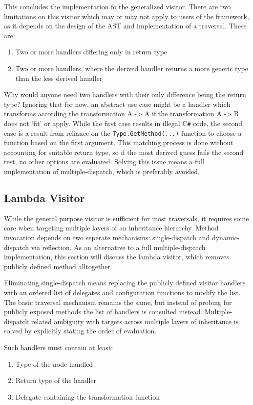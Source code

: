 \documentclass[twoside,openright]{uva-bachelor-thesis}
\newcommand{\code}[1]{\texttt{\footnotesize#1}}
\newcommand{\cs}{C\texttt{\#}\xspace}
\begin{document}
			This concludes the implementation fo the generalized visitor. There are two limitations on this visitor which may or may not apply to users of the framework, as it depends on the design of the AST and implementation of a traversal. These are:
			\begin{enumerate}
				\item Two or more handlers differing only in return type
				\item Two or more handlers, where the derived handler returns a more generic type than the less derived handler
			\end{enumerate}
			
			Why would anyone need two handlers with their only difference being the return type? Ignoring that for now, an abstract use case might be a handler which transforms according the transformation A -> A if the transformation A -> B does not `fit' or apply. While the first case results in illegal \cs code, the second case is a result from reliance on the \code{Type.GetMethod(...)} function to choose a function based on the first argument. This matching process is done without accounting for suitable return type, so if the most derived guess fails the second test, no other options are evaluated. Solving this issue means a full implementation of multiple-dispatch, which is preferably avoided.
			
				
		\subsection{Lambda Visitor}
			While the general purpose visitor is sufficient for most traversals, it requires some care when targeting multiple layers of an inheritance hierarchy. Method invocation depends on two seperate mechanisms: single-dispatch and dynamic-dispatch via reflection. As an alternative to a full multiple-dispatch implementation, this section will discuss the lambda visitor, which removes publicly defined method alltogether.
			
			Eliminating single-dispatch means replacing the publicly defined visitor handlers with an ordered list of delegates and configuration functions to modify the list. The basic traversal mechanism remains the same, but instead of probing for publicly exposed methods the list of handlers is consulted instead. Multiple-dispatch related ambiguity with targets across multiple layers of inheritance is solved by explicitly stating the order of evaluation.
			
			Such handlers must contain at least:
			\begin{enumerate}
				\item Type of the node handled
				\item Return type of the handler
				\item Delegate containing the transformation function
			\end{enumerate}
			
\end{document}
